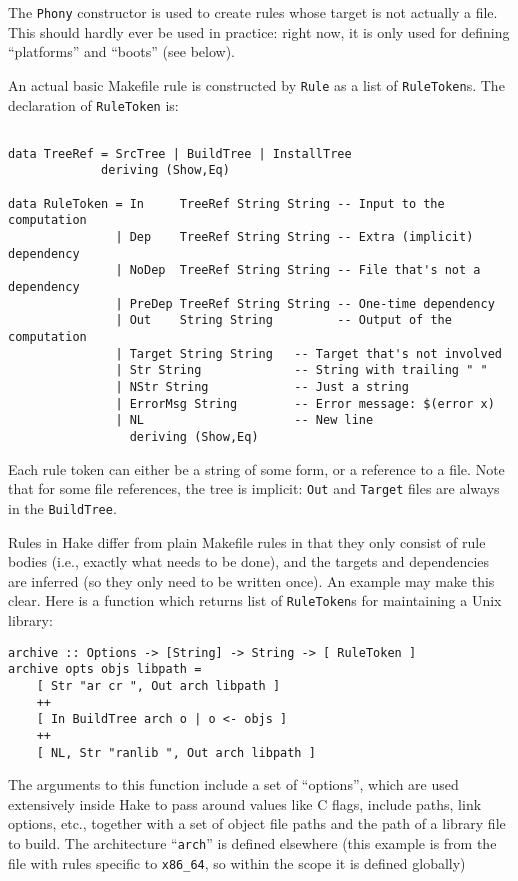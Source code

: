 \documentclass[a4paper,twoside]{report} %
\begin{document}
The \texttt{Phony} constructor is used to create rules whose target is
not actually a file.  This should hardly ever be used in practice:
right now, it is only used for defining ``platforms'' and ``boots''
(see below).

An actual basic Makefile rule is constructed by \texttt{Rule} as a
list of \texttt{RuleToken}s.  The declaration of \texttt{RuleToken}
is:
\begin{verbatim}

data TreeRef = SrcTree | BuildTree | InstallTree
             deriving (Show,Eq)

data RuleToken = In     TreeRef String String -- Input to the computation
               | Dep    TreeRef String String -- Extra (implicit) dependency
               | NoDep  TreeRef String String -- File that's not a dependency
               | PreDep TreeRef String String -- One-time dependency
               | Out    String String         -- Output of the computation
               | Target String String   -- Target that's not involved
               | Str String             -- String with trailing " "
               | NStr String            -- Just a string
               | ErrorMsg String        -- Error message: $(error x)
               | NL                     -- New line
                 deriving (Show,Eq)
\end{verbatim}
Each rule token can either be a string of some form, or a reference to
a file.   Note that for some file references, the tree is implicit:
\texttt{Out} and \texttt{Target} files are always in the
\texttt{BuildTree}.

Rules in Hake differ from plain Makefile rules in that
they only consist of rule bodies (i.e., exactly what needs to be
done), and the targets and dependencies are inferred (so they only
need to be written once).  An example may make this clear.  Here is a
function which returns list of \texttt{RuleToken}s for maintaining a
Unix library:
\begin{verbatim}
archive :: Options -> [String] -> String -> [ RuleToken ]
archive opts objs libpath =
    [ Str "ar cr ", Out arch libpath ] 
    ++ 
    [ In BuildTree arch o | o <- objs ]
    ++ 
    [ NL, Str "ranlib ", Out arch libpath ]
\end{verbatim}
The arguments to this function include a set of ``options'', which are
used extensively inside Hake to pass around values like C flags,
include paths, link options, etc., together with a set of object file
paths and the path of a library file to build.  The architecture
``\texttt{arch}'' is defined elsewhere (this example is from the file
with rules specific to \texttt{x86\_64}, so within the scope it is
defined globally)
\end{document}
